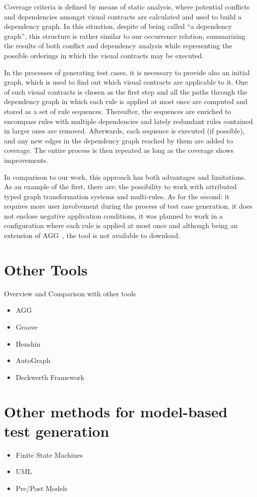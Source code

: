 Coverage criteria is defined by means of static analysis, where potential conflicts and dependencies amongst visual contracts are calculated and used to build a dependency graph. In this situation, despite of being called ``a dependency graph'', this structure is rather similar to our occurrence relation, summarizing the results of both conflict and dependency analysis while representing the possible orderings in which the visual contracts may be executed.

In the processes of generating test cases, it is necessary to provide also an initial graph, which is used to find out which visual contracts are applicable to it. One of such visual contracts is chosen as the first step and all the paths through the dependency graph in which each rule is applied at most once are computed and stored as a set of rule sequences. Thereafter, the sequences are enriched to encompass rules with multiple dependencies and lately redundant rules contained in larger ones are
removed. Afterwards, each sequence is executed (if possible), and any new edges in the dependency graph reached by them are added to coverage. The entire process is then repeated as long as the coverage shows improvements. 

In comparison to our work, this approach has both advantages and limitations. As an example of the first, there are: the possibility to work with attributed typed graph transformation systems and multi-rules. As for the second: it requires more user involvement during the process of test case generation, it does not enclose negative application conditions, it was planned to work in a configuration where each rule is applied at most once and although being an extension of
AGG~\cite{Taentzer2000}, the tool is not available to download.

\section{Other Tools}

Overview and Comparison with other tools

\begin{itemize}
\item AGG
\item Groove
\item Henshin
\item AutoGraph
\item Deckwerth Framework
\end{itemize}

\section{Other methods for model-based test generation}

\begin{itemize}
  \item Finite State Machines
  \item UML
  \item Pre/Post Models
\end{itemize}

